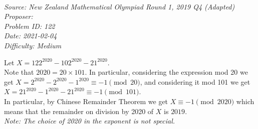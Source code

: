   
\SSbreak\\
\emph{Source: New Zealand Mathematical Olympiad Round 1, 2019 Q4 (Adapted)}\\
\emph{Proposer: \Pbrain }\\ %
\emph{Problem ID: 122}\\
\emph{Date: 2021-02-04}\\
\emph{Difficulty: Medium}\\
\SSbreak

\bigskip

\begin{solution}\hfil\medskip
	
	Let \(X = 122^{2020} - 102^{2020} - 21^{2020}\). \\
	Note that \(2020 = 20 \times 101\). In particular, considering the expression mod 20 we get \(X = 2^{2020} - 2^{2020} - 1^{2020} \equiv -1 \pmod{20}\), and considering it mod 101 we get \(X = 21^{2020} - 1^{2020} - 21^{2020} \equiv -1 \pmod{101}\). \\
	In particular, by Chinese Remainder Theorem we get \(X \equiv -1 \pmod{2020}\) which means that the remainder on division by 2020 of \(X\) is \(\boxed{2019}\). \\
	\emph{Note: The choice of 2020 in the exponent is not special.}
\end{solution}\bigskip
